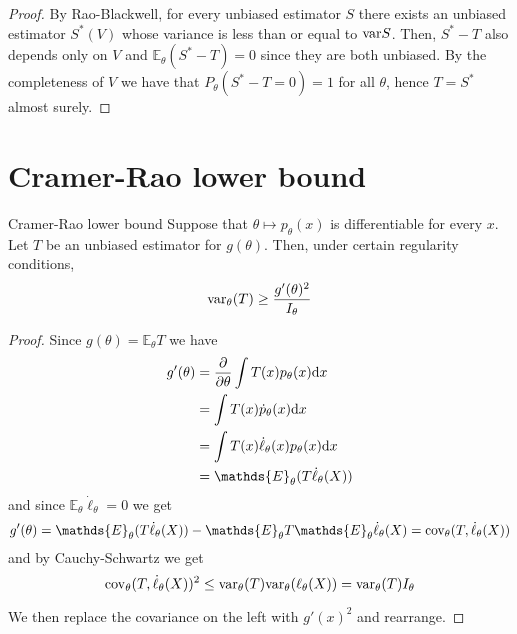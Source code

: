 \documentclass[12pt]{extarticle}
\newcommand{\cov}{{\operatorfont cov}}
\renewcommand{\var}{{\operatorfont var}}
\newcommand{\E}{\mathds{E}}
\begin{document}
\begin{proof}
	By Rao-Blackwell, for every unbiased estimator $S$ there exists an unbiased estimator $S^*(V)$
	whose variance is less than or equal to $\var S$.
	Then, $S^* - T$ also depends only on $V$ and $\E_\theta(S^* - T) = 0$ since they are both unbiased.
	By the completeness of $V$ we have that $P_\theta(S^* - T = 0) = 1$ for all $\theta$,
	hence $T = S^*$ almost surely.
\end{proof}

\section{Cramer-Rao lower bound}

\begin{theorem}{Cramer-Rao lower bound}{}
	Suppose that $\theta \mapsto p_\theta(x)$ is differentiable for every $x$.
	Let $T$ be an unbiased estimator for $g(\theta)$.
	Then, under certain regularity conditions,
	\begin{equation}
		\var_\theta (T) \geq \frac{g'(\theta)^2}{I_\theta}
	\end{equation}
\end{theorem}

\begin{proof}
	Since $g(\theta) = \E_\theta T$ we have
	\begin{align}
		g'(\theta) & = \pdv{\theta} \int T(x) p_\theta(x) \dd x        \\
		           & = \int T(x) \dot{p}_\theta(x) \dd x               \\
		           & = \int T(x) \dot \ell_\theta(x) p_\theta(x) \dd x \\
		           & = \E_\theta (T \dot \ell_\theta (X))
	\end{align}
	and since $\E_\theta \dot \ell_\theta = 0$ we get
	\begin{equation}
		g'(\theta) = \E_\theta (T \dot \ell_\theta (X)) - \E_\theta T \E_\theta \dot \ell_\theta(X) = \cov_\theta(T, \dot \ell_\theta(X))
	\end{equation}
	and by Cauchy-Schwartz we get
	\begin{equation}
		\cov_\theta(T, \dot \ell_\theta(X))^2 \leq \var_\theta (T) \var_\theta (\ell_\theta(X)) = \var_\theta (T) I_\theta
	\end{equation}

	We then replace the covariance on the left with $g'(x)^2$ and rearrange.
\end{proof}
\end{document}
